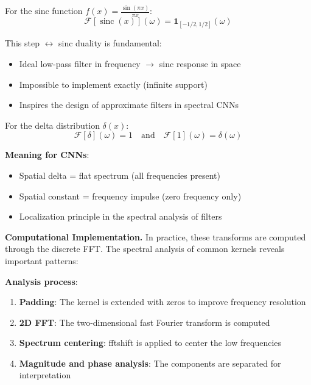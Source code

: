\begin{example}\label{ex:fourier_sinc}
For the sinc function $f(x) = \frac{\sin(\pi x)}{\pi x}$:
\begin{equation}
\mathcal{F}[\operatorname{sinc}(x)](\omega) = \mathbf{1}_{[-1/2,1/2]}(\omega)
\end{equation}

This step $\leftrightarrow$ sinc duality is fundamental:
\begin{itemize}
    \item Ideal low-pass filter in frequency $\rightarrow$ sinc response in space
    \item Impossible to implement exactly (infinite support)
    \item Inspires the design of approximate filters in spectral CNNs
\end{itemize}
\end{example}

\begin{example}\label{ex:fourier_delta}
For the delta distribution $\delta(x)$:
\begin{equation}
\mathcal{F}[\delta](\omega) = 1 \quad \text{and} \quad \mathcal{F}[1](\omega) = \delta(\omega)
\end{equation}

\textbf{Meaning for CNNs}:
\begin{itemize}
    \item Spatial delta = flat spectrum (all frequencies present)
    \item Spatial constant = frequency impulse (zero frequency only)
    \item Localization principle in the spectral analysis of filters
\end{itemize}
\end{example}

\textbf{Computational Implementation.} In practice, these transforms are computed through the discrete \gls{FFT}. The spectral analysis of common kernels reveals important patterns:

\textbf{Analysis process}:
\begin{enumerate}
    \item \textbf{Padding}: The kernel is extended with zeros to improve frequency resolution
    \item \textbf{2D \gls{FFT}}: The two-dimensional fast Fourier transform is computed
    \item \textbf{Spectrum centering}: fftshift is applied to center the low frequencies
    \item \textbf{Magnitude and phase analysis}: The components are separated for interpretation
\end{enumerate}

